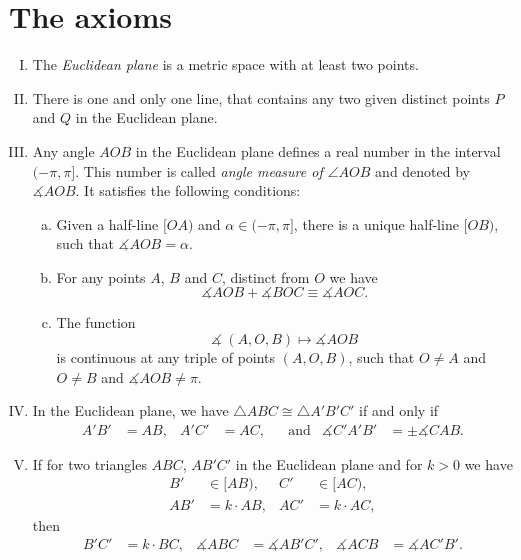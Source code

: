 
\newpage

\section*{The axioms}

\begin{framed}
\begin{enumerate}[I.]
\item\label{def:birkhoff-axioms:0} The \emph{Euclidean plane} is a metric space with at least two points.


\item\label{def:birkhoff-axioms:1} 
There is one and only one line, that contains any two given distinct points $P$ and $Q$ in the Euclidean plane.

\item\label{def:birkhoff-axioms:2} 
Any angle $AOB$ in the Euclidean plane 
defines a real number in the interval $(-\pi,\pi]$.
This number is called \emph{angle measure of $\angle AOB$}
and denoted by $\measuredangle A O B$.
It satisfies the following conditions:
\begin{enumerate}[(a)]
\item\label{def:birkhoff-axioms:2a} 
Given a half-line $[O A)$ and $\alpha\in(-\pi,\pi]$, 
there is a unique  half-line $[O B)$, 
such that $\measuredangle A O B= \alpha$.
\item\label{def:birkhoff-axioms:2b} 
For any points $A$, $B$ and $C$, distinct from $O$ we have
$$\measuredangle A O B+\measuredangle B O C
\equiv\measuredangle A O C.$$
\item\label{def:birkhoff-axioms:2c} 
The function 
$$\measuredangle\:(A,O,B)\mapsto\measuredangle A O B$$
is continuous at any triple of points $(A,O,B)$,
such that $O\ne A$ and $O\ne B$ and $\measuredangle A O B\ne\pi$.

\end{enumerate}

\item\label{def:birkhoff-axioms:3}  
In the Euclidean plane, we have
$\triangle A B C\cong\triangle A' B' C'$
if and only if 
\begin{align*}
A' B'&=A B, & A' C'&= A C, &&\text{and}
&\measuredangle C' A' B'&=\pm\measuredangle C A B.
\end{align*}
\item\label{def:birkhoff-axioms:4}
If for two triangles $ABC$, $AB'C'$ in the Euclidean plane
and for $k>0$ we have
\begin{align*}
B'&\in [AB),
& C'&\in [AC),
\\
AB'&=k\cdot AB,&
AC'&=k\cdot AC,
\end{align*}
then
\begin{align*}
B'C'&=k\cdot BC,&
\measuredangle ABC&=\measuredangle AB'C',
&
\measuredangle ACB&=\measuredangle AC'B'.
\end{align*}
\end{enumerate}
\end{framed}

